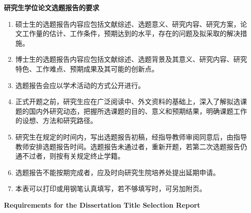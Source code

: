 \begin{center}
    {\zhheiti{}\bfseries 研究生学位论文选题报告的要求}
\end{center}

\vspace{0.2cm}

\begin{enumerate}[leftmargin=2.2em, itemsep=2pt, topsep=2pt, parsep=0pt]
    \item[{\zhfont 一、}] {\zhfont 硕士生的选题报告内容应包括文献综述、选题意义、研究内容、研究方案，论文工作量的估计、工作条件，预期达到的水平，存在的问题及拟采取的解决措施。}
    \item[{\zhfont 二、}] {\zhfont 博士生的选题报告内容应包括文献综述、选题背景及其意义、研究内容、研究特色、工作难点、预期成果及其可能的创新点。}
    \item[{\zhfont 三、}] {\zhfont 选题报告会应以学术活动的方式公开进行。}
    \item[{\zhfont 四、}] {\zhfont 正式开题之前，研究生应在广泛阅读中、外文资料的基础上，深入了解拟选课题的国内外研究动态，把握所选课题的目的、意义和预期结果，明确课题工作的设想、方法和研究路径。}
    \item[{\zhfont 五、}] {\zhfont 研究生在规定的时间内，写出选题报告初稿，经指导教师审阅同意后，由指导教师安排选题报告时间。选题报告未通过者，重新开题，若第二次选题报告仍通不过者，则按有关规定终止学籍。}
    \item[{\zhfont 六、}] {\zhfont 选题报告不能按期完成者，应及时向研究生院培养处提出延期申请。}
    \item[{\zhfont 七、}] {\zhfont 本表可以打印或用钢笔认真填写，若不够填写时，可另加附页。}
\end{enumerate}

\vspace{0.4cm}

\begin{center}
    {\textbf{Requirements for the Dissertation Title Selection Report}}
\end{center}

\vspace{0.2cm}

